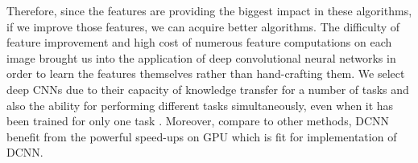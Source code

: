 
\indent Therefore, since the features are providing the biggest impact in these algorithms, if we improve those features, we can acquire better algorithms. The difficulty of feature improvement and high cost of numerous feature computations on each image brought us into the application of deep convolutional neural networks in order to learn the features themselves rather than hand-crafting them. We select deep CNNs due to their capacity of knowledge transfer for a number of tasks and also the ability for performing different tasks simultaneously, even when it has been trained for only one task \cite{zhou2014learning}. Moreover, compare to other methods, DCNN benefit from the powerful speed-ups on GPU which is fit for implementation of DCNN. 




